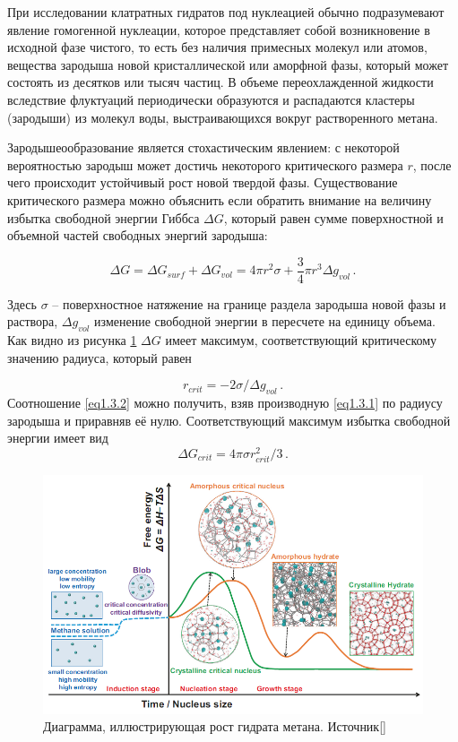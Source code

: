\par При исследовании клатратных гидратов под нуклеацией обычно подразумевают явление гомогенной нуклеации, которое представляет собой возникновение в исходной фазе чистого, то есть без наличия примесных молекул или атомов, вещества зародыша новой кристаллической или аморфной фазы, который может состоять из десятков или тысяч частиц. В объеме переохлажденной жидкости вследствие флуктуаций периодически образуются и распадаются кластеры (зародыши) из молекул воды, выстраивающихся вокруг растворенного метана.

\par Зародышеообразование является стохастическим явлением: с некоторой вероятностью зародыш может достичь некоторого критического размера $r$, после чего происходит устойчивый рост новой твердой фазы. Существование критического размера можно объяснить если обратить внимание на величину избытка свободной энергии Гиббса $\Delta G$, который равен сумме поверхностной и объемной частей свободных энергий зародыша:

\begin{equation}
\Delta G = \Delta G_{surf} + \Delta G_{vol} = 4\pi r^2 \sigma + \frac{3}{4}\pi r^3 \Delta g_{vol} \, .
\label{eq1.3.1}
\end{equation}

Здесь $\sigma$ -- поверхностное натяжение на границе раздела зародыша новой фазы и раствора, $\Delta g_{vol}$ изменение свободной энергии в пересчете на единицу объема. Как видно из рисунка \ref{fig1.3.1} $\Delta G$ имеет максимум, соответствующий критическому значению радиуса, который равен

\begin{equation}
    r_{crit} = -2\sigma/\Delta g_{vol} \,.
    \label{eq1.3.2}
\end{equation}
Соотношение \ref{eq1.3.2} можно получить, взяв производную \ref{eq1.3.1} по радиусу зародыша и приравняв её нулю. Соответствующий максимум избытка свободной энергии имеет вид
\begin{equation}
    \Delta G_{crit} = 4\pi\sigma r_{crit}^2 / 3 \,.
    \label{eq1.3.3}
\end{equation}

\begin{figure}[H] 
    \centering
    \includegraphics[width=.9\linewidth]{figures/hydrnucl.png}
    \caption{Диаграмма, иллюстрирующая рост гидрата метана. Источник[]}
    \label{fig1.3.1}
\end{figure}

